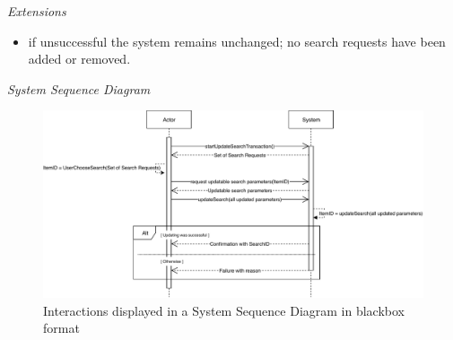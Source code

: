 \textsl{Extensions}
\begin{itemize}[noitemsep]
	\item if unsuccessful the system remains unchanged; no search requests have been added or removed.
\end{itemize}
\textsl{System Sequence Diagram}
\begin{figure}[H]
	\centering
	\includegraphics[scale=1]{uml/SD-bb-update-search.pdf}
	\caption*{Interactions displayed in a System Sequence Diagram in blackbox format}
\end{figure}